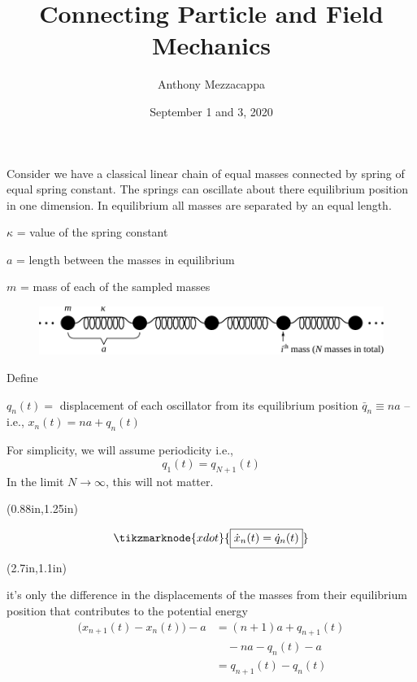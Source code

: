 \documentclass{article}
\title{Connecting Particle and Field Mechanics}
\author{Anthony Mezzacappa}
\date{September 1 and 3, 2020}
\begin{document}
\setlength{\parskip}{1em}

\maketitle

\noindent Consider we have a classical linear chain of equal masses connected by spring of equal spring constant. The springs can oscillate about there equilibrium position in one dimension. In equilibrium all masses are separated by an equal length. \par

$\kappa$ = value of the spring constant \par
$a$ = length between the masses in equilibrium\par
$m$ = mass of each of the sampled masses\par

\begin{figure}[h!]
    \centering
    \includegraphics[width=\textwidth]{pics/04-linear-chain.pdf}
    \label{fig:l4-linear-chain}
\end{figure}

\noindent Define \par
$q_n(t) =$ displacement of each oscillator from its equilibrium position $\bar{q}_n \equiv na $ -- i.e., $x_n(t) = na+q_n(t)$

\noindent For simplicity, we will assume periodicity i.e.,
\begin{equation*}
    q_1(t) =q_{N+1}(t)
\end{equation*}
In the limit $N \rightarrow \infty$, this will not matter.


{%
\begin{textblock*}{2in}(0.88in,1.25in)%
\begin{minipage}[h!]{2in}
    \begin{equation*}
        \tikzmarknode{xdot}{\boxed{\dot{x}_n (t) = \dot{q}_n (t)}}
    \end{equation*}
\end{minipage}%
\end{textblock*}%
}

{%
\begin{textblock*}{2.8in}(2.7in,1.1in)%
\begin{minipage}[h!]{2.8in}
    \noindent it's only the difference in the displacements of the masses from their equilibrium position that contributes to the potential energy
    \begin{align*}
        \big( x_{n+1} (t) - x_n (t) \big) - a &= ( n + 1 ) a + q_{n+1} (t) \\
        &\quad - n a - q_n (t) - a \\
        &= q_{n+1} (t) - q_n (t)
    \end{align*}
\end{minipage}%
\end{textblock*}%
}
\end{document}
